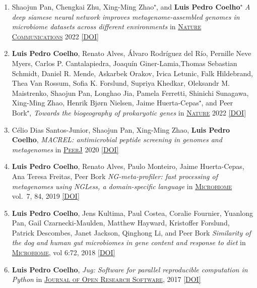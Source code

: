 \documentclass{article}
\newcommand\showdoi[1]{%
    \href{http://dx.doi.org/#1}{[DOI]}%
}
\newcommand\pubname[1]{\textsc{\uline{#1}}}
\newcommand\contribution[1]{\relax}
\begin{document}
\begin{enumerate}[resume]
\item Shaojun Pan, Chengkai Zhu, Xing-Ming Zhao⁺, and \textbf{Luis Pedro
Coelho}⁺ \emph{A deep siamese neural network improves metagenome-assembled
genomes in microbiome datasets across different environments} in
\pubname{Nature Communications} 2022 \showdoi{10.1038/s41467-022-29843-y}

\item \textbf{Luis Pedro Coelho}, Renato Alves, Álvaro Rodríguez del Río,
Pernille Neve Myers, Carlos P. Cantalapiedra, Joaquín Giner-Lamia,Thomas
Sebastian Schmidt, Daniel R. Mende, Askarbek Orakov, Ivica Letunic, Falk
Hildebrand, Thea Van Rossum, Sofia K. Forslund, Supriya Khedkar, Oleksandr M.
Maistrenko, Shaojun Pan, Longhao Jia, Pamela Ferretti, Shinichi Sunagawa,
Xing-Ming Zhao, Henrik Bjørn Nielsen, Jaime Huerta-Cepas⁺, and Peer Bork⁺,
\emph{Towards the biogeography of prokaryotic genes} in \pubname{Nature} 2022
\showdoi{10.1038/s41586-021-04233-4}

\item Célio Dias Santos-Junior, Shaojun Pan, Xing-Ming Zhao, \textbf{Luis Pedro
Coelho}, \emph{MACREL: antimicrobial peptide screening in genomes and
metagenomes} in \pubname{PeerJ} 2020 \showdoi{10.7717/peerj.10555}

\item \textbf{Luis Pedro Coelho}, Renato Alves, Paulo Monteiro, Jaime
Huerta-Cepas, Ana Teresa Freitas, Peer Bork \emph{NG-meta-profiler: fast
processing of metagenomes using NGLess, a domain-specific language} in
\pubname{Microbiome} vol.\ 7, 84, 2019 \showdoi{10.1186/s40168-019-0684-8}
\contribution{I conceived of the concept, co-wrote the software and the manuscript}

\item \textbf{Luis Pedro Coelho}, Jens Kultima, Paul Costea, Coralie Fournier,
Yuanlong Pan, Gail Czarnecki-Maulden, Matthew Hayward, Kristoffer Forslund,
Patrick Descombes, Janet Jackson, Qinghong Li, and Peer Bork \emph{Similarity
of the dog and human gut microbiomes in gene content and response to diet} in
\pubname{Microbiome}, vol 6:72, 2018 \showdoi{10.1186/s40168-018-0450-3}
\contribution{I designed and implemented the analysis strategy, wrote the first
version of the manuscript, and lead the subsequent incorporation of co-author
suggestions.}

\item \textbf{Luis Pedro Coelho}, \emph{Jug: Software for parallel reproducible
computation in Python} in \pubname{Journal of Open Research
Software}, 2017 \showdoi{10.5334/jors.161}
\contribution{I designed and implemented the software presented and wrote the
manuscript.}


\end{enumerate}
\end{document}
